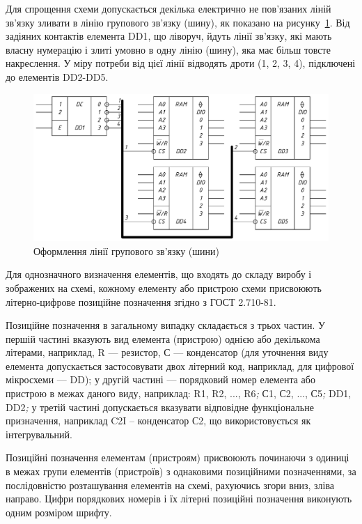 Для спрощення схеми допускається декілька електрично не пов’я\-за\-них ліній зв’язку зливати в лінію групового зв’язку (шину), як показано на рисунку~\ref{fig:shina}. Від задіяних контактів елемента {\gostfnt DD1}, що ліворуч, йдуть лінії зв’яз\-ку, які мають власну нумерацію і злиті умовно в одну лінію (шину), яка має більш товсте накреслення. У міру потреби від
цієї лінії відводять дроти (1, 2, 3, 4), підключені до елементів {\gostfnt DD2-DD5}.

\begin{figure}[h]
\centering
\includegraphics[width=\textwidth]{img/shina-crop.pdf}
\caption{Оформлення лінії групового зв'язку (шини)}
\label{fig:shina}
\end{figure}

Для однозначного визначення елементів, що входять до складу виробу і зображених на схемі, кожному елементу або пристрою схеми присвоюють літерно-цифрове позиційне позначення згідно з ГОСТ 2.710-81.

	Позиційне позначення в загальному випадку складається з трьох частин. У першій частині вказують вид елемента (пристрою) однією або декількома літерами, наприклад, {\gostfnt R} — резистор, {\gostfnt С} — конденсатор (для уточнення виду елемента допускається застосовувати двох літерний код, наприклад, для цифрової мікросхеми — {\gostfnt DD}); у другій частині — порядковий номер елемента або пристрою в межах даного виду, наприклад: {\gostfnt R1, R2, ..., R6}\textit{;} {\gostfnt С1, С2, ..., С5}\textit{;} {\gostfnt DD1, DD2}\textit{;} у третій частині допускається вказувати відповідне функціональне призначення, наприклад {\gostfnt C2I} -- конденсатор {\gostfnt С2}, що використовується як інтегрувальний. 

Позиційні позначення елементам (пристроям) присвоюють починаючи з одиниці в межах групи елементів (пристроїв) з однаковими позиційними позначеннями, за послідовністю розташування елементів на схемі, рахуючись згори вниз, зліва направо. Цифри порядкових номерів і їх літерні позиційні позначення виконують одним розміром шрифту.

